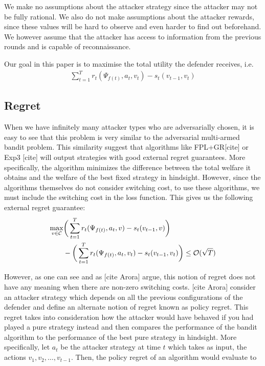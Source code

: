 We make no assumptions about the attacker strategy since the attacker may not be fully rational. We also do not make assumptions about the attacker rewards, since these values will be hard to observe and even harder to find out beforehand. We however assume that the attacker has access to information from the previous rounds and is capable of reconnaissance.

Our goal in this paper is to maximise the total utility the defender receives, i.e.
\begin{align*}
    \sum_{t=1}^T r_t(\Psi_{f(t)}, a_t, v_t) - s_t(v_{t-1}, v_t)
\end{align*}

\subsection{Regret}\label{subsec:regret}
When we have infinitely many attacker types who are adversarially chosen, it is easy to see that this problem is very similar to the adversarial multi-armed bandit problem. This similarity suggest that algorithms like FPL+GR[cite] or Exp3 [cite] will output strategies with good external regret guarantees. More specifically, the algorithm minimizes the difference between the total welfare it obtains and the welfare of the best fixed strategy in hindsight. However, since the algorithms themselves do not consider switching cost, to use these algorithms, we must include the switching cost in the loss function. This gives us the following external regret guarantee:
\begin{align*}
    \max_{v \in \cal C} & \bigg (\sum_{t=1}^T r_t(\Psi_{f(t)}, a_t, v) - s_t(v_{t-1}, v) \bigg ) \\
    & - \bigg ( \sum_{t=1}^T r_t(\Psi_{f(t)}, a_t, v_t) - s_t(v_{t-1}, v_t) \bigg ) 
    \le \cal O(\sqrt{T})
\end{align*}

However, as one can see and as [cite Arora] argue, this notion of regret does not have any meaning when there are non-zero switching costs. [cite Arora] consider an attacker strategy which depends on all the previous configurations of the defender and define an alternate notion of regret known as policy regret. This regret takes into consideration how the attacker would have behaved if you had played a pure strategy instead and then compares the performance of the bandit algorithm to the performance of the best pure strategy in hindsight. More specifically, let $a_t$ be the attacker strategy at time $t$ which takes as input, the actions $v_1, v_2, \dots, v_{t-1}$. Then, the policy regret of an algorithm would evaluate to

